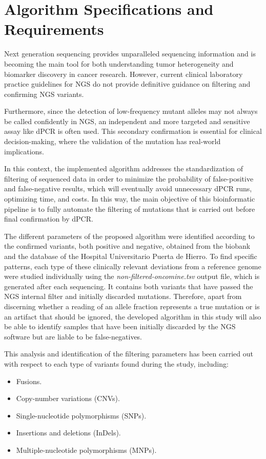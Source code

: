 \section{Algorithm Specifications and Requirements} \label{Ch3:Algorithm}

Next generation sequencing provides unparalleled sequencing information and is becoming the main tool for both understanding tumor heterogeneity and biomarker discovery in cancer research. However, current clinical laboratory practice guidelines for NGS do not provide definitive guidance on filtering and confirming NGS variants.

Furthermore, since the detection of low-frequency mutant alleles may not always be called confidently in NGS, an independent and more targeted and sensitive assay like dPCR is often used. This secondary confirmation is essential for clinical decision-making, where the validation of the mutation has real-world implications.

In this context, the implemented algorithm addresses the standardization of filtering of sequenced data in order to minimize the probability of false-positive and false-negative results, which will eventually avoid unnecessary dPCR runs, optimizing time, and costs. In this way, the main objective of this bioinformatic pipeline is to fully automate the filtering of mutations that is carried out before final confirmation by dPCR.

The different parameters of the proposed algorithm were identified according to the confirmed variants, both positive and negative, obtained from the biobank and the database of the Hospital Universitario Puerta de Hierro. To find specific patterns, each type of these clinically relevant deviations from a reference genome were studied individually using the \textit{non-filtered-oncomine.tsv} output file, which is generated after each sequencing. It contains both variants that have passed the NGS internal filter and initially discarded mutations. Therefore, apart from discerning whether a reading of an allele fraction represents a true mutation or is an artifact that should be ignored, the developed algorithm in this study will also be able to identify samples that have been initially discarded by the NGS software but are liable to be false-negatives.

This analysis and identification of the filtering parameters has been carried out with respect to each type of variants found during the study, including:
\begin{itemize}
    \item Fusions.
    \item Copy-number variations (CNVs).
    \item Single-nucleotide polymorphisms (SNPs).
    \item Insertions and deletions (InDels).
    \item Multiple-nucleotide polymorphisms (MNPs).
\end{itemize}

